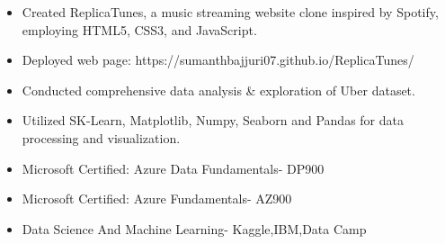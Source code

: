 \documentclass[10pt,a4paper,ragged2e]{altacv}
\begin{document}
\divider

\begin{itemize}
\item Created ReplicaTunes, a music streaming website clone inspired by Spotify, employing HTML5, CSS3, and JavaScript.
\item Deployed web page: https://sumanthbajjuri07.github.io/ReplicaTunes/
\end{itemize}

\divider

\begin{itemize}
\item Conducted comprehensive data analysis \& exploration of Uber dataset.
\item Utilized SK-Learn, Matplotlib, Numpy, Seaborn and Pandas for data processing and visualization.
\end{itemize}
















\begin{itemize}
   \item Microsoft Certified: Azure Data Fundamentals- DP900
    \item Microsoft Certified: Azure Fundamentals- AZ900
    \item Data Science And Machine Learning- Kaggle,IBM,Data Camp
 
   
   
\end{itemize}
\end{document}
